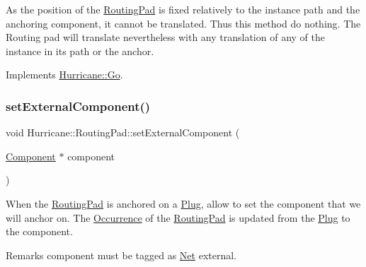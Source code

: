 As the position of the \mbox{\hyperlink{classHurricane_1_1RoutingPad}{Routing\+Pad}} is fixed relatively to the instance path and the anchoring component, it cannot be translated. Thus this method do nothing. The Routing pad will translate nevertheless with any translation of any of the instance in it\textquotesingle{}s path or the anchor. 

Implements \mbox{\hyperlink{classHurricane_1_1Go_a54c4351dbbf4045e1aa89f06bb893402}{Hurricane\+::\+Go}}.

\mbox{\label{classHurricane_1_1RoutingPad_a9f448ad4f05f6995edc4a5ab50501586}} 
\subsubsection{\texorpdfstring{set\+External\+Component()}{setExternalComponent()}}
{\footnotesize\ttfamily void Hurricane\+::\+Routing\+Pad\+::set\+External\+Component (\begin{DoxyParamCaption}\item[{\mbox{\hyperlink{classHurricane_1_1Component}{Component}} $\ast$}]{component }\end{DoxyParamCaption})}

When the \mbox{\hyperlink{classHurricane_1_1RoutingPad}{Routing\+Pad}} is anchored on a \mbox{\hyperlink{classHurricane_1_1Plug}{Plug}}, allow to set the {\ttfamily component} that we will anchor on. The \mbox{\hyperlink{classHurricane_1_1Occurrence}{Occurrence}} of the \mbox{\hyperlink{classHurricane_1_1RoutingPad}{Routing\+Pad}} is updated from the \mbox{\hyperlink{classHurricane_1_1Plug}{Plug}} to the {\ttfamily component}.

\begin{DoxyRemark}{Remarks}
{\ttfamily component} must be tagged as \mbox{\hyperlink{classHurricane_1_1Net}{Net}} external. 
\end{DoxyRemark}
\mbox{\label{classHurricane_1_1RoutingPad_a410992ef75c40f9a898c36f39a7d1a1a}} 
